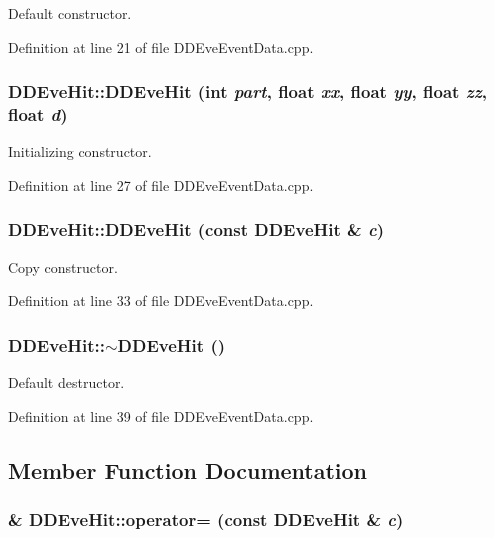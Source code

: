 Default constructor. 

Definition at line 21 of file DDEveEventData.cpp.\hypertarget{class_d_d4hep_1_1_d_d_eve_hit_aea1dc4022717ea0e59bb01add44a1892}{
\subsubsection[{DDEveHit}]{\setlength{\rightskip}{0pt plus 5cm}DDEveHit::DDEveHit (int {\em part}, \/  float {\em xx}, \/  float {\em yy}, \/  float {\em zz}, \/  float {\em d})}}
\label{class_d_d4hep_1_1_d_d_eve_hit_aea1dc4022717ea0e59bb01add44a1892}


Initializing constructor. 

Definition at line 27 of file DDEveEventData.cpp.\hypertarget{class_d_d4hep_1_1_d_d_eve_hit_acbcc398eded594815f5f0258b7f8fbb1}{
\subsubsection[{DDEveHit}]{\setlength{\rightskip}{0pt plus 5cm}DDEveHit::DDEveHit (const {\bf DDEveHit} \& {\em c})}}
\label{class_d_d4hep_1_1_d_d_eve_hit_acbcc398eded594815f5f0258b7f8fbb1}


Copy constructor. 

Definition at line 33 of file DDEveEventData.cpp.\hypertarget{class_d_d4hep_1_1_d_d_eve_hit_a2abe001ed0473c3cd00fe2137887935f}{
\subsubsection[{$\sim$DDEveHit}]{\setlength{\rightskip}{0pt plus 5cm}DDEveHit::$\sim$DDEveHit ()}}
\label{class_d_d4hep_1_1_d_d_eve_hit_a2abe001ed0473c3cd00fe2137887935f}


Default destructor. 

Definition at line 39 of file DDEveEventData.cpp.

\subsection{Member Function Documentation}
\hypertarget{class_d_d4hep_1_1_d_d_eve_hit_ae8e64c5c76fe170a8ea6c4e3cf44f35d}{
\subsubsection[{operator=}]{ \& DDEveHit::operator= (const {\bf DDEveHit} \& {\em c})}}
\label{class_d_d4hep_1_1_d_d_eve_hit_ae8e64c5c76fe170a8ea6c4e3cf44f35d}


